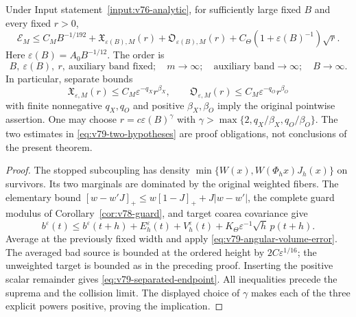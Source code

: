 \begin{theorem}
\label{thm:v79-separated-endpoint}
Under Input statement~\ref{input:v76-analytic}, for sufficiently large
fixed $B$ and every fixed $r>0$,
\begin{equation}\label{eq:v79-separated-endpoint}
 \mathcal E_M\le C_MB^{-1/192}
       +\mathfrak X_{\varepsilon(B),M}(r)
       +\mathfrak O_{\varepsilon(B),M}(r)
       +C_\Theta(1+\varepsilon(B)^{-1})\sqrt r.
\end{equation}
Here $\varepsilon(B)=A_0B^{-1/12}$. The order is
\[
 B,\ \varepsilon(B),\ r,\ \text{auxiliary band fixed};\quad
 m\to\infty;\quad \text{auxiliary band}\to\infty;\quad B\to\infty.
\]
In particular, separate bounds
\begin{equation}\label{eq:v79-two-hypotheses}
 \mathfrak X_{\varepsilon,M}(r)\le C_M\varepsilon^{-q_X}r^{\beta_X},
 \qquad
 \mathfrak O_{\varepsilon,M}(r)\le C_M\varepsilon^{-q_O}r^{\beta_O}
\end{equation}
with finite nonnegative $q_X,q_O$ and positive $\beta_X,\beta_O$
imply the original pointwise assertion. One may choose
$r=c\varepsilon(B)^\gamma$ with
$\gamma>\max\{2,q_X/\beta_X,q_O/\beta_O\}$.
The two estimates in \eqref{eq:v79-two-hypotheses} are proof obligations,
not conclusions of the present theorem.
\end{theorem}
\begin{proof}
The stopped subcoupling has density
$\min\{W(x),W(\Phi_hx)J_h(x)\}$ on survivors. Its two marginals
are dominated by the original weighted fibers. The elementary bound
$[w-w'J]_+\le w[1-J]_++J|w-w'|$, the complete guard modulus of
Corollary~\ref{cor:v78-guard}, and target coarea covariance give
\[
 b^\varepsilon(t)\le b^\varepsilon(t+h)+E_h^\varepsilon(t)
       +V_h^\varepsilon(t)
       +K_\Theta\varepsilon^{-1}\sqrt h\,p(t+h).
\]
Average at the previously fixed width and apply
\eqref{eq:v79-angular-volume-error}. The averaged bad source is
bounded at the ordered height by $2C\varepsilon^{1/16}$; the
unweighted target is bounded as in the preceding proof. Inserting the
positive scalar remainder gives \eqref{eq:v79-separated-endpoint}.
All inequalities precede the suprema and the collision limit.
The displayed choice of $\gamma$ makes each of the three explicit
powers positive, proving the implication.
\end{proof}

